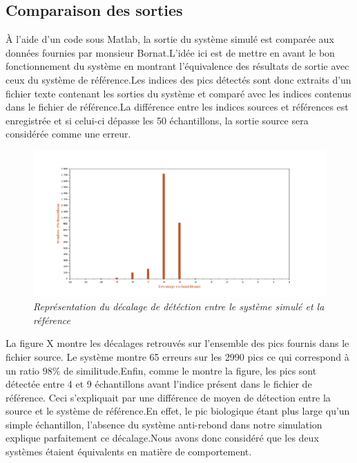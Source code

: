 \documentclass[a4paper,12pt]{article}
\begin{document}
\subsection{Comparaison des sorties}
À l'aide d'un code sous Matlab, la sortie du système simulé est comparée aux données fournies par monsieur Bornat.L'idée ici est de mettre en avant le bon fonctionnement du système en montrant l'équivalence des résultats de sortie avec ceux du système de référence.Les indices des pics détectés sont donc extraits d'un fichier texte contenant les sorties du système et comparé avec les indices contenus dans le fichier de référence.La différence entre les indices sources et références est enregistrée et si celui-ci dépasse les 50 échantillons, la sortie source sera considérée comme une erreur. 
\begin{figure}[H]
	\centering
	\includegraphics[scale=0.3, keepaspectratio]{ResultatSim.png}
	\caption{\textit{Représentation du décalage de détéction entre le système simulé et la référence}}
\end{figure}
La figure X montre les décalages retrouvés sur l'ensemble des pics fournis dans le fichier source. Le système montre 65 erreurs sur les 2990 pics ce qui correspond à un ratio $98 \%$ de similitude.Enfin, comme le montre la figure, les pics sont détectée entre 4 et 9 échantillons avant l'indice présent dans le fichier de référence. Ceci s'expliquait par une différence de moyen de détection entre la source et le système de référence.En effet, le pic biologique étant plus large qu'un simple échantillon, l'absence du système anti-rebond dans notre simulation explique parfaitement ce décalage.Nous avons donc considéré que les deux systèmes étaient équivalents en matière de comportement.
\newpage
\end{document}
